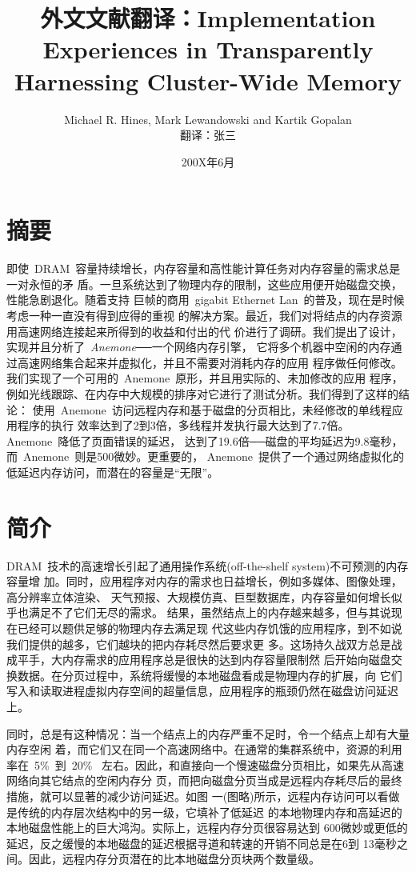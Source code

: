 \documentclass[dvipdfm, NoBUAAtitle]{BUAApaper}
\begin{document}
\title{外文文献翻译：Implementation Experiences in Transparently Harnessing Cluster-Wide Memory}
\author{Michael R. Hines, Mark Lewandowski and Kartik Gopalan\\翻译：张三}
\date{200X年6月}
\maketitle

\section*{摘要}

即使~DRAM~容量持续增长，内存容量和高性能计算任务对内存容量的需求总是一对永恒的矛
盾。一旦系统达到了物理内存的限制，这些应用便开始磁盘交换，性能急剧退化。随着支持
巨帧的商用~gigabit Ethernet Lan~的普及，现在是时候考虑一种一直没有得到应得的重视
的解决方案。最近，我们对将结点的内存资源用高速网络连接起来所得到的收益和付出的代
价进行了调研。我们提出了设计，实现并且分析了~{\em Anemone}──一个网络内存引擎，
它将多个机器中空闲的内存通过高速网络集合起来并虚拟化，并且不需要对消耗内存的应用
程序做任何修改。我们实现了一个可用的~Anemone~原形，并且用实际的、未加修改的应用
程序，例如光线跟踪、在内存中大规模的排序对它进行了测试分析。我们得到了这样的结论：
使用~Anemone~访问远程内存和基于磁盘的分页相比，未经修改的单线程应用程序的执行
效率达到了2到3倍，多线程并发执行最大达到了7.7倍。Anemone~降低了页面错误的延迟，
达到了19.6倍──磁盘的平均延迟为9.8毫秒，而~Anemone~则是500微妙。更重要的，
Anemone~提供了一个通过网络虚拟化的低延迟内存访问，而潜在的容量是``无限''。

\section{简介}

DRAM~技术的高速增长引起了通用操作系统(off-the-shelf system)不可预测的内存容量增
加。同时，应用程序对内存的需求也日益增长，例如多媒体、图像处理，高分辨率立体渲染、
天气预报、大规模仿真、巨型数据库，内存容量如何增长似乎也满足不了它们无尽的需求。
结果，虽然结点上的内存越来越多，但与其说现在已经可以题供足够的物理内存去满足现
代这些内存饥饿的应用程序，到不如说我们提供的越多，它们越块的把内存耗尽然后要求更
多。这场持久战双方总是战成平手，大内存需求的应用程序总是很快的达到内存容量限制然
后开始向磁盘交换数据。在分页过程中，系统将缓慢的本地磁盘看成是物理内存的扩展，向
它们写入和读取进程虚拟内存空间的超量信息，应用程序的瓶颈仍然在磁盘访问延迟上。

同时，总是有这种情况：当一个结点上的内存严重不足时，令一个结点上却有大量内存空闲
着，而它们又在同一个高速网络中。在通常的集群系统中，资源的利用率在~5\%~到~20\%~
左右。因此，和直接向一个慢速磁盘分页相比，如果先从高速网络向其它结点的空闲内存分
页，而把向磁盘分页当成是远程内存耗尽后的最终措施，就可以显著的减少访问延迟。如图
一(图略)所示，远程内存访问可以看做是传统的内存层次结构中的另一级，它填补了低延迟
的本地物理内存和高延迟的本地磁盘性能上的巨大鸿沟。实际上，远程内存分页很容易达到
600微妙或更低的延迟，反之缓慢的本地磁盘的延迟根据寻道和转速的开销不同总是在6到
13毫秒之间。因此，远程内存分页潜在的比本地磁盘分页块两个数量级。
\end{document}
